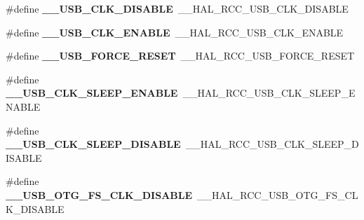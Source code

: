 \begin{DoxyCompactItemize}
\item 
\hypertarget{group___h_a_l___r_c_c___aliased_ga008be7939856314751eb981d3d1b59a3}{\#define {\bfseries \-\_\-\-\_\-\-U\-S\-B\-\_\-\-C\-L\-K\-\_\-\-D\-I\-S\-A\-B\-L\-E}~\-\_\-\-\_\-\-H\-A\-L\-\_\-\-R\-C\-C\-\_\-\-U\-S\-B\-\_\-\-C\-L\-K\-\_\-\-D\-I\-S\-A\-B\-L\-E}\label{group___h_a_l___r_c_c___aliased_ga008be7939856314751eb981d3d1b59a3}

\item 
\hypertarget{group___h_a_l___r_c_c___aliased_gaf24171e66b567b30d1ecb05bf218043f}{\#define {\bfseries \-\_\-\-\_\-\-U\-S\-B\-\_\-\-C\-L\-K\-\_\-\-E\-N\-A\-B\-L\-E}~\-\_\-\-\_\-\-H\-A\-L\-\_\-\-R\-C\-C\-\_\-\-U\-S\-B\-\_\-\-C\-L\-K\-\_\-\-E\-N\-A\-B\-L\-E}\label{group___h_a_l___r_c_c___aliased_gaf24171e66b567b30d1ecb05bf218043f}

\item 
\hypertarget{group___h_a_l___r_c_c___aliased_ga24aaba01becfa624ec6e3b0ea8890615}{\#define {\bfseries \-\_\-\-\_\-\-U\-S\-B\-\_\-\-F\-O\-R\-C\-E\-\_\-\-R\-E\-S\-E\-T}~\-\_\-\-\_\-\-H\-A\-L\-\_\-\-R\-C\-C\-\_\-\-U\-S\-B\-\_\-\-F\-O\-R\-C\-E\-\_\-\-R\-E\-S\-E\-T}\label{group___h_a_l___r_c_c___aliased_ga24aaba01becfa624ec6e3b0ea8890615}

\item 
\hypertarget{group___h_a_l___r_c_c___aliased_ga8bdfc42836049dfac32f91b006c16592}{\#define {\bfseries \-\_\-\-\_\-\-U\-S\-B\-\_\-\-C\-L\-K\-\_\-\-S\-L\-E\-E\-P\-\_\-\-E\-N\-A\-B\-L\-E}~\-\_\-\-\_\-\-H\-A\-L\-\_\-\-R\-C\-C\-\_\-\-U\-S\-B\-\_\-\-C\-L\-K\-\_\-\-S\-L\-E\-E\-P\-\_\-\-E\-N\-A\-B\-L\-E}\label{group___h_a_l___r_c_c___aliased_ga8bdfc42836049dfac32f91b006c16592}

\item 
\hypertarget{group___h_a_l___r_c_c___aliased_gaf172450b93f91a70d86ad5afed46b933}{\#define {\bfseries \-\_\-\-\_\-\-U\-S\-B\-\_\-\-C\-L\-K\-\_\-\-S\-L\-E\-E\-P\-\_\-\-D\-I\-S\-A\-B\-L\-E}~\-\_\-\-\_\-\-H\-A\-L\-\_\-\-R\-C\-C\-\_\-\-U\-S\-B\-\_\-\-C\-L\-K\-\_\-\-S\-L\-E\-E\-P\-\_\-\-D\-I\-S\-A\-B\-L\-E}\label{group___h_a_l___r_c_c___aliased_gaf172450b93f91a70d86ad5afed46b933}

\item 
\hypertarget{group___h_a_l___r_c_c___aliased_gae40dc64569aaca471dff7a6547f11abe}{\#define {\bfseries \-\_\-\-\_\-\-U\-S\-B\-\_\-\-O\-T\-G\-\_\-\-F\-S\-\_\-\-C\-L\-K\-\_\-\-D\-I\-S\-A\-B\-L\-E}~\-\_\-\-\_\-\-H\-A\-L\-\_\-\-R\-C\-C\-\_\-\-U\-S\-B\-\_\-\-O\-T\-G\-\_\-\-F\-S\-\_\-\-C\-L\-K\-\_\-\-D\-I\-S\-A\-B\-L\-E}\label{group___h_a_l___r_c_c___aliased_gae40dc64569aaca471dff7a6547f11abe}


\end{DoxyCompactItemize}
